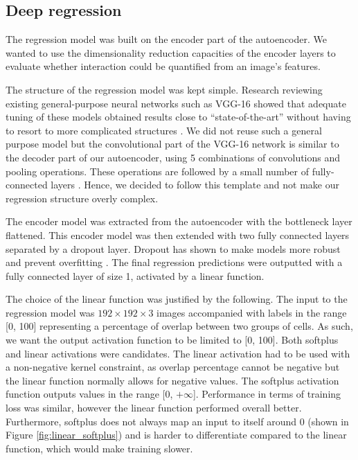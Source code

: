 \subsection{Deep regression}

The regression model was built on the encoder part of the autoencoder. We wanted to use the dimensionality reduction capacities of the encoder layers to evaluate whether interaction could be quantified from an image's features.

The structure of the regression model was kept simple. Research reviewing existing general-purpose neural networks such as VGG-16 showed that adequate tuning of these models obtained results close to ``state-of-the-art'' without having to resort to more complicated structures \citep{Lathu2018}. We did not reuse such a general purpose model but the convolutional part of the VGG-16 network is similar to the decoder part of our autoencoder, using 5 combinations of convolutions and pooling operations. These operations are followed by a small number of fully-connected layers \citep{Simonyan15}. Hence, we decided to follow this template and not make our regression structure overly complex.

The encoder model was extracted from the autoencoder with the bottleneck layer flattened. This encoder model was then extended with two fully connected layers separated by a dropout layer. Dropout has shown to make models more robust and prevent overfitting \citep{hinton_improving_2012}. The final regression predictions were outputted with a fully connected layer of size 1, activated by a linear function.

The choice of the linear function was justified by the following. The input to the regression model was $192\times192\times3$ images accompanied with labels in the range [0, 100] representing a percentage of overlap between two groups of cells. As such, we want the output activation function to be limited to [0, 100]. Both softplus and linear activations were candidates. The linear activation had to be used with a non-negative kernel constraint, as overlap percentage cannot be negative but the linear function normally allows for negative values. The softplus activation function outputs values in the range [0, $+\infty$]. Performance in terms of training loss was similar, however the linear function performed overall better. Furthermore, softplus does not always map an input to itself around 0 (shown in Figure \ref{fig:linear_softplus}) and is harder to differentiate compared to the linear function, which would make training slower.  

